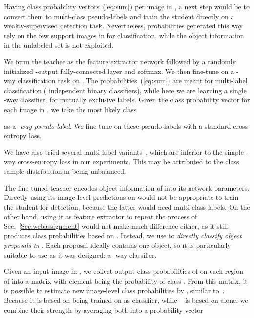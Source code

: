 \documentclass[review]{elsarticle}
\begin{document}
{Having class probability vectors~(\ref{eq:sum}) per image in ,}
a next step would be to convert them to multi-class pseudo-labels and
train the student
directly {on a weakly-supervised detection task}.
Nevertheless, probabilities generated this way rely on the few support images in  for classification, while the object information in the unlabeled set  is not exploited. 




{We form the teacher  as the feature extractor network  followed by
a randomly initialized -output fully-connected layer and softmax. We then fine-tune
}
on a -way classification task on
. The probabilities~(\ref{eq:sum}) are meant for multi-label classification ( independent binary classifiers), while here we are learning a single -way classifier, {\ie for mutually exclusive labels.}
Given the class probability vector  for each image  in , we take the most likely class

as a \emph{-way pseudo-label}. {We fine-tune } on these pseudo-labels with a standard cross-entropy loss.


We have also tried several multi-label variants~\cite{wei2016pami,zhu2017cvpr}, which are inferior
to the simple -way cross-entropy loss {in our experiments}. This may be attributed to the class sample distribution in  being unbalanced.



{The fine-tuned teacher }
encodes object information of  into its network parameters. Directly using its image-level predictions on  would not be appropriate to
{train the student }
for detection, because the latter would need multi-class labels. On the other hand, using it as feature extractor to repeat the process of Sec.~\ref{Sec:webassignment} would not make much difference either, as it still produces class probabilities based on . Instead, we use {} to \emph{directly classify object proposals in }. Each proposal ideally contains one object, so it is particularly suitable to use {} as it was designed: a -way classifier.

Given an input image  in , we collect output {class} probabilities of {} on each region  of  into a  matrix  with
{element  being the probability of class .}
From this matrix, it is possible to estimate new image-level class probabilities by , similar to~.
Because it is based on {} being trained on  as classifier, while ~ is based on  alone, we combine their strength by averaging both into a probability vector
\end{document}

